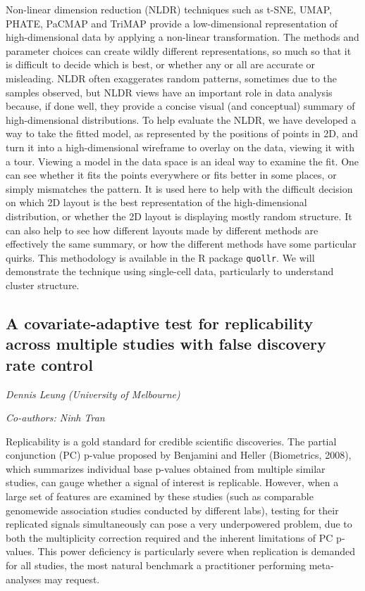 \documentclass[
]{scrreprt}
\begin{document}
Non-linear dimension reduction (NLDR) techniques such as t-SNE, UMAP,
PHATE, PaCMAP and TriMAP provide a low-dimensional representation of
high-dimensional data by applying a non-linear transformation. The
methods and parameter choices can create wildly different
representations, so much so that it is difficult to decide which is
best, or whether any or all are accurate or misleading. NLDR often
exaggerates random patterns, sometimes due to the samples observed, but
NLDR views have an important role in data analysis because, if done
well, they provide a concise visual (and conceptual) summary of
high-dimensional distributions. To help evaluate the NLDR, we have
developed a way to take the fitted model, as represented by the
positions of points in 2D, and turn it into a high-dimensional wireframe
to overlay on the data, viewing it with a tour. Viewing a model in the
data space is an ideal way to examine the fit. One can see whether it
fits the points everywhere or fits better in some places, or simply
mismatches the pattern. It is used here to help with the difficult
decision on which 2D layout is the best representation of the
high-dimensional distribution, or whether the 2D layout is displaying
mostly random structure. It can also help to see how different layouts
made by different methods are effectively the same summary, or how the
different methods have some particular quirks. This methodology is
available in the R package \texttt{quollr}. We will demonstrate the
technique using single-cell data, particularly to understand cluster
structure.

\subsection{A covariate-adaptive test for replicability across multiple
studies with false discovery rate
control}\label{a-covariate-adaptive-test-for-replicability-across-multiple-studies-with-false-discovery-rate-control}

\emph{Dennis Leung} \emph{(University of
Melbourne)}

\emph{Co-authors: Ninh Tran}

\setlength{\parskip}{0.5em}

Replicability is a gold standard for credible scientific discoveries.
The partial conjunction (PC) p-value proposed by Benjamini and Heller
(Biometrics, 2008), which summarizes individual base p-values obtained
from multiple similar studies, can gauge whether a signal of interest is
replicable. However, when a large set of features are examined by these
studies (such as comparable genomewide association studies conducted by
different labs), testing for their replicated signals simultaneously can
pose a very underpowered problem, due to both the multiplicity
correction required and the inherent limitations of PC p-values. This
power deficiency is particularly severe when replication is demanded for
all studies, the most natural benchmark a practitioner performing
meta-analyses may request.
\end{document}

